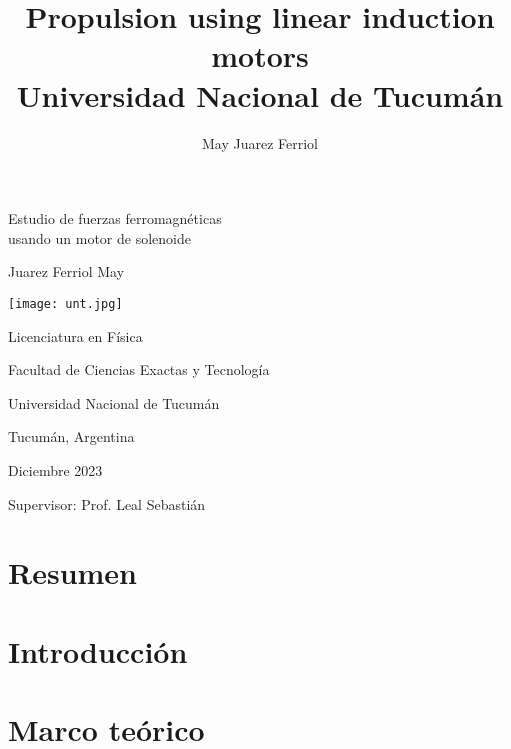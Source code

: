 \documentclass[a4paper,12pt]{article}
\title{Propulsion using linear induction motors\\ 
\medskip \large Universidad Nacional de Tucumán}
\author{May Juarez Ferriol}
\date{}
\begin{document}
\begin{titlepage}

    \begin{center}

        \vspace*{2cm}

        \Huge
        Estudio de fuerzas ferromagnéticas \\
        usando un motor de solenoide

        \vspace{1cm}

        \LARGE
        Juarez Ferriol May

        \vspace{1cm}

        \texttt{[image: unt.jpg]}

        \vspace{1cm}

        \Large
        Licenciatura en Física

        Facultad de Ciencias Exactas y Tecnología

        Universidad Nacional de Tucumán

        Tucumán, Argentina

        \vspace{1cm}

        Diciembre 2023

        \vspace{1cm}

        Supervisor: Prof. Leal Sebastián

    \end{center}

\end{titlepage}

\section*{Resumen}

    

\section*{Introducción}

    

\section*{Marco teórico}
\end{document}
